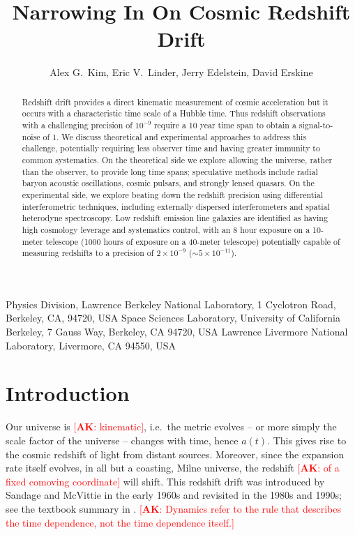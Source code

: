 \documentclass[preprint2, 10pt]{aastex}
\newcommand{\alex}[1]{\textcolor{red}{[{\bf AK}: #1]}}
\begin{document}
\title{Narrowing In On Cosmic Redshift Drift} 
\author{Alex G.\ Kim, Eric V.\ Linder, Jerry Edelstein, David Erskine}
{
Physics Division, Lawrence Berkeley National Laboratory, 1 Cyclotron Road, Berkeley, CA, 94720, USA}
{
Space Sciences Laboratory, University of California Berkeley, 7 Gauss Way, Berkeley, CA 94720, USA
}
{
Lawrence Livermore National Laboratory, Livermore,
CA 94550, USA
}



\begin{abstract} 
Redshift drift provides a direct kinematic measurement of cosmic acceleration 
but it occurs with a characteristic time scale of a Hubble time.  Thus 
redshift observations with a challenging precision of $10^{-9}$ require a 
10 year time span to obtain a signal-to-noise of 1. We discuss theoretical 
and experimental approaches to address this challenge, potentially requiring 
less observer time and having greater immunity to common systematics.  On 
the theoretical side we explore allowing the universe, rather than the 
observer, to provide long time spans; speculative methods include radial 
baryon acoustic oscillations, cosmic pulsars, and strongly lensed quasars. 
On the experimental side, we explore beating down the redshift precision 
using differential interferometric techniques, including externally 
dispersed interferometers and spatial heterodyne spectroscopy. Low 
redshift emission line galaxies are identified as having high cosmology 
leverage and systematics control, with an 8 hour exposure on a 10-meter 
telescope (1000 hours of exposure on a 40-meter telescope) potentially 
capable of measuring redshifts to a precision of $2\times 10^{-9}$ 
($\sim5\times 10^{-11}$). 
\end{abstract}




\section{Introduction} \label{Sec:intro} 

Our universe is \alex{kinematic}, i.e.\ the metric evolves -- or more simply the 
scale factor of the universe -- changes with time, hence $a(t)$.  This 
gives rise to the cosmic redshift of light from distant sources.  Moreover, 
since the expansion rate itself evolves, in all but a coasting, Milne 
universe, the redshift \alex{of a fixed comoving coordinate} will shift.  This redshift drift was 
introduced by Sandage \citep{sandage} and McVittie \citep{mcvittie} in the 
early 1960s and revisited in the 1980s and 1990s; see the textbook 
summary in \citet{fpoc}. 
\alex{Dynamics refer to the rule that describes the time dependence, not the time dependence itself.}
\end{document}
